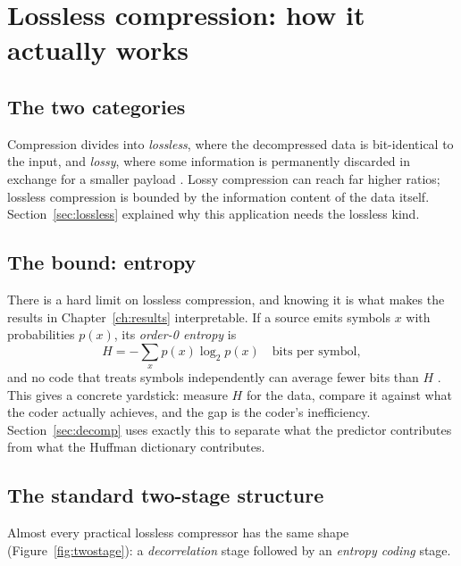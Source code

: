 \section{Lossless compression: how it actually works}
\label{sec:compression}

\subsection{The two categories}

Compression divides into \emph{lossless}, where the decompressed data is
bit-identical to the input, and \emph{lossy}, where some information is
permanently discarded in exchange for a smaller payload \cite{sayood2017}.
Lossy compression can reach far higher ratios; lossless compression is bounded
by the information content of the data itself. Section~\ref{sec:lossless}
explained why this application needs the lossless kind.

\subsection{The bound: entropy}

There is a hard limit on lossless compression, and knowing it is what makes the
results in Chapter~\ref{ch:results} interpretable. If a source emits symbols
$x$ with probabilities $p(x)$, its \emph{order-0 entropy} is
\begin{equation}
\label{eq:entropy}
H = -\sum_x p(x) \log_2 p(x) \quad\text{bits per symbol},
\end{equation}
and no code that treats symbols independently can average fewer bits than $H$
\cite{sayood2017}. This gives a concrete yardstick: measure $H$ for the data,
compare it against what the coder actually achieves, and the gap is the coder's
inefficiency. Section~\ref{sec:decomp} uses exactly this to separate what the
predictor contributes from what the Huffman dictionary contributes.

\subsection{The standard two-stage structure}

Almost every practical lossless compressor has the same shape
(Figure~\ref{fig:twostage}): a \emph{decorrelation} stage followed by an
\emph{entropy coding} stage.

